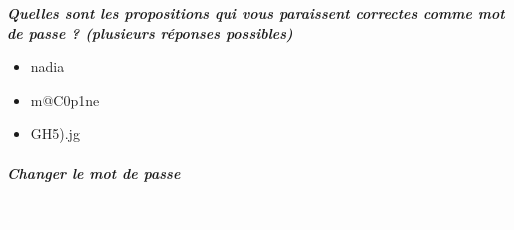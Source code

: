 \documentclass[11pt,a4paper]{article}
\begin{document}
                    \textbf{\textit{
Quelles sont les propositions qui vous paraissent correctes comme mot de passe ? (plusieurs r\'eponses possibles)
}}
                
            \begin{itemize} 
        
            \item[ \ding{"6D} ] 
nadia

        
            \item[ \ding{"6D} ] 
m@C0p1ne

        
            \item[ \ding{"6D} ] 
GH5).jg

        
            \end{itemize} 
        
			
		\subparagraph{Changer le mot de passe} 
		
					\textcolor{white}{.} \par
				
            \par
        
\end{document}
